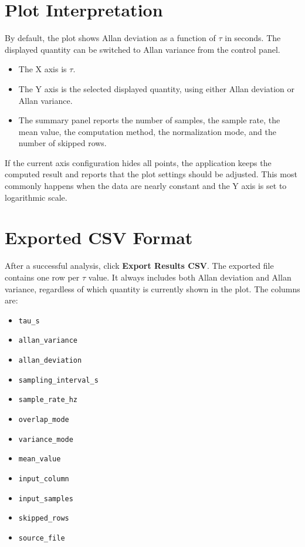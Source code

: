 \documentclass[11pt,a4paper]{article}
\begin{document}
\section{Plot Interpretation}
By default, the plot shows Allan deviation as a function of \(\tau\) in seconds. The displayed quantity can be switched to Allan variance from the control panel.
\begin{itemize}[leftmargin=1.5em]
    \item The X axis is \(\tau\).
    \item The Y axis is the selected displayed quantity, using either Allan deviation or Allan variance.
    \item The summary panel reports the number of samples, the sample rate, the mean value, the computation method, the normalization mode, and the number of skipped rows.
\end{itemize}

If the current axis configuration hides all points, the application keeps the computed result and reports that the plot settings should be adjusted. This most commonly happens when the data are nearly constant and the Y axis is set to logarithmic scale.

\section{Exported CSV Format}
After a successful analysis, click \textbf{Export Results CSV}. The exported file contains one row per \(\tau\) value. It always includes both Allan deviation and Allan variance, regardless of which quantity is currently shown in the plot. The columns are:
\begin{itemize}[leftmargin=1.5em]
    \item \texttt{tau\_s}
    \item \texttt{allan\_variance}
    \item \texttt{allan\_deviation}
    \item \texttt{sampling\_interval\_s}
    \item \texttt{sample\_rate\_hz}
    \item \texttt{overlap\_mode}
    \item \texttt{variance\_mode}
    \item \texttt{mean\_value}
    \item \texttt{input\_column}
    \item \texttt{input\_samples}
    \item \texttt{skipped\_rows}
    \item \texttt{source\_file}
\end{itemize}
\end{document}
